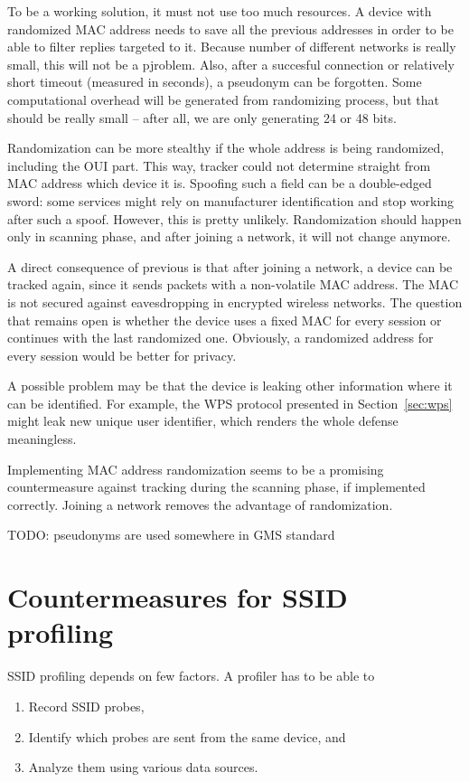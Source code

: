 \documentclass[12pt,a4paper,oneside,pdftex]{report}
\begin{document}
To be a working solution, it must not use too much resources. A device with randomized MAC address needs to save all the previous addresses in order to be able to filter replies targeted to it. Because number of different networks is really small, this will not be a pjroblem. Also, after a succesful connection or relatively short timeout (measured in seconds), a pseudonym can be forgotten. Some computational overhead will be generated from randomizing process, but that should be really small -- after all, we are only generating 24 or 48 bits.

Randomization can be more stealthy if the whole address is being randomized, including the OUI part. This way, tracker could not determine straight from MAC address which device it is. Spoofing such a field can be a double-edged sword: some services might rely on manufacturer identification and stop working after such a spoof. However, this is pretty unlikely. Randomization should happen only in scanning phase, and after joining a network, it will not change anymore.

A direct consequence of previous is that after joining a network, a device can be tracked again, since it sends packets with a non-volatile MAC address. The MAC is not secured against eavesdropping in encrypted wireless networks. The question that remains open is whether the device uses a fixed MAC for every session or continues with the last randomized one. Obviously, a randomized address for every session would be better for privacy.

A possible problem may be that the device is leaking other information where it can be identified. For example, the WPS protocol presented in Section~\ref{sec:wps} might leak new unique user identifier, which renders the whole defense meaningless.

Implementing MAC address randomization seems to be a promising countermeasure against tracking during the scanning phase, if implemented correctly. Joining a network removes the advantage of randomization.

TODO: pseudonyms are used somewhere in GMS standard

\section{Countermeasures for SSID profiling}
\label{sec:countermeasures_ssid}

SSID profiling depends on few factors. A profiler has to be able to \begin{enumerate}
    \item Record SSID probes,
    \item Identify which probes are sent from the same device, and
    \item Analyze them using various data sources.
\end{enumerate}
\end{document}
